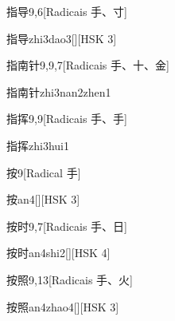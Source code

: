 \begin{entry}{指导}{9,6}[Radicais ⼿、⼨]
  \begin{phonetics}{指导}{zhi3dao3}[][HSK 3]
  \end{phonetics}
\end{entry}

\begin{entry}{指南针}{9,9,7}[Radicais ⼿、⼗、⾦]
  \begin{phonetics}{指南针}{zhi3nan2zhen1}
  \end{phonetics}
\end{entry}

\begin{entry}{指挥}{9,9}[Radicais ⼿、⼿]
  \begin{phonetics}{指挥}{zhi3hui1}
  \end{phonetics}
\end{entry}

\begin{entry}{按}{9}[Radical ⼿]
  \begin{phonetics}{按}{an4}[][HSK 3]
  \end{phonetics}
\end{entry}

\begin{entry}{按时}{9,7}[Radicais ⼿、⽇]
  \begin{phonetics}{按时}{an4shi2}[][HSK 4]
  \end{phonetics}
\end{entry}

\begin{entry}{按照}{9,13}[Radicais ⼿、⽕]
  \begin{phonetics}{按照}{an4zhao4}[][HSK 3]
  \end{phonetics}
\end{entry}

